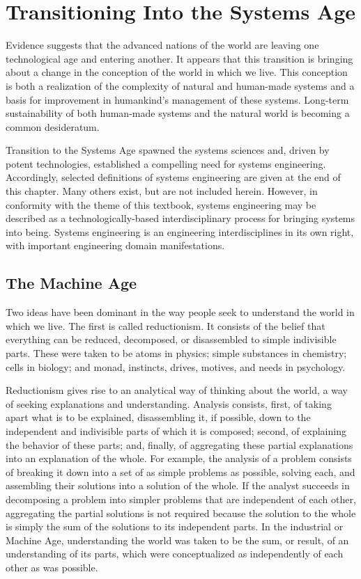 
\section{Transitioning Into the Systems Age}

Evidence suggests that the advanced nations of the world are leaving one technological age and entering another. It appears that this transition is bringing about a change in the conception of the world in which we live. This conception is both a realization of the complexity of natural and human-made systems and a basis for improvement in humankind’s management of these systems. Long-term sustainability of both human-made systems and the natural world is becoming a common desideratum.

Transition to the Systems Age spawned the systems sciences and, driven by potent technologies, established a compelling need for systems engineering. Accordingly, selected definitions of systems engineering are given at the end of this chapter. Many others exist, but are not included herein. However, in conformity with the theme of this textbook, systems engineering may be described as a technologically-based interdisciplinary process for bringing systems into being. Systems engineering is an engineering interdisciplines in its own right, with important engineering domain manifestations.

\subsection{The Machine Age}

Two ideas have been dominant in the way people seek to understand the world in which we live. The first is called reductionism. It consists of the belief that everything can be reduced, decomposed, or disassembled to simple indivisible parts. These were taken to be atoms in physics; simple substances in chemistry; cells in biology; and monad, instincts, drives, motives, and needs in psychology.

Reductionism gives rise to an analytical way of thinking about the world, a way of seeking explanations and understanding. Analysis consists, first, of taking apart what is to be explained, disassembling it, if possible, down to the independent and indivisible parts of which it is composed; second, of explaining the behavior of these parts; and, finally, of aggregating these partial explanations into an explanation of the whole. For example, the analysis of a problem consists of breaking it down into a set of as simple problems as possible, solving each, and assembling their solutions into a solution of the whole. If the analyst succeeds in decomposing a problem into simpler problems that are independent of each other, aggregating the partial solutions is not required because the solution to the whole is simply the sum of the solutions to its independent parts. In the industrial or Machine Age, understanding the world was taken to be the sum, or result, of an understanding of its parts, which were conceptualized as independently of each other as was possible.

